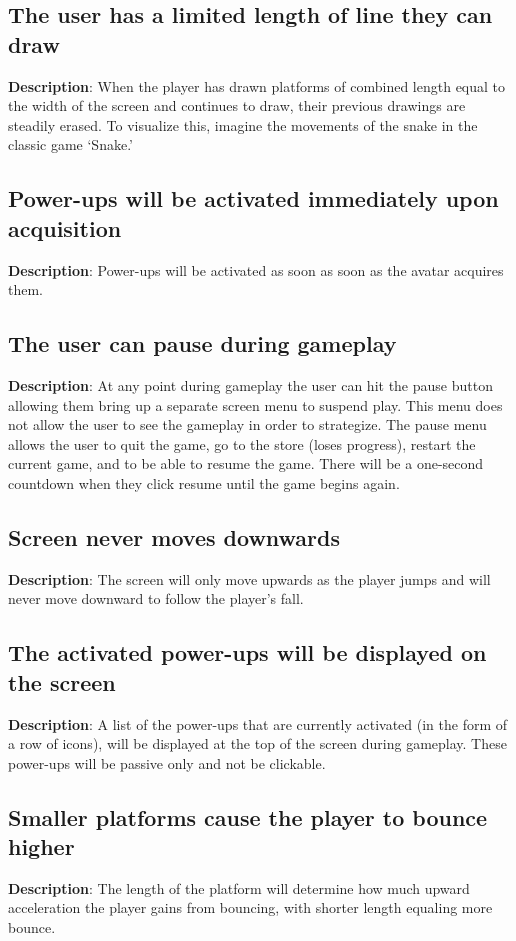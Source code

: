 \subsection{The user has a limited length of line they can draw}
\textbf{Description}: When the player has drawn platforms of combined
length equal to the width of the screen and continues to draw, their previous
drawings are steadily erased. To visualize this, imagine the movements
of the snake in the classic game \textquoteleft{}Snake.\textquoteright{}

\subsection{Power-ups will be activated immediately upon acquisition }
\textbf{Description}: Power-ups will be activated as soon as soon
as the avatar acquires them.

\subsection{The user can pause during gameplay}
\textbf{Description}: At any point during gameplay the user can hit
the pause button allowing them bring up a separate screen menu to
suspend play. This menu does not allow the user to see the gameplay
in order to strategize. The pause menu allows the user to quit the
game, go to the store (loses progress), restart the current game,
and to be able to resume the game. There will be a one-second countdown
when they click resume until the game begins again.

\subsection{Screen never moves downwards}
\textbf{Description}: The screen will only move upwards as the player
jumps and will never move downward to follow the player\textquoteright{}s
fall.

\subsection{The activated power-ups will be displayed on the screen}
\textbf{Description}: A list of the power-ups that are currently activated
(in the form of a row of icons), will be displayed at the top of the
screen during gameplay. These power-ups will be passive only and not
be clickable.

\subsection{Smaller platforms cause the player to bounce higher}
\label{GAME-12}
\textbf{Description}: The length of the platform will determine how
much upward acceleration the player gains from bouncing, with shorter
length equaling more bounce.

